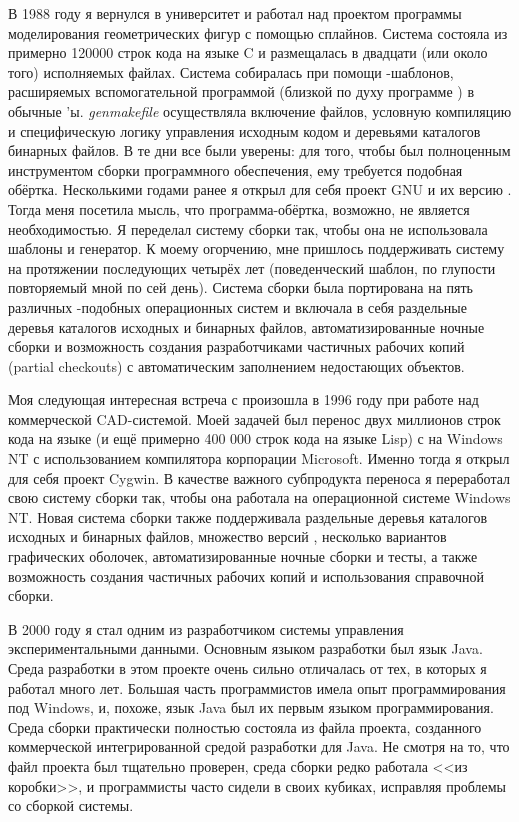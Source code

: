 В 1988 году я вернулся в университет и работал над проектом программы
моделирования геометрических фигур с помощью сплайнов. Система
состояла из примерно 120000 строк кода на языке C и размещалась в
двадцати (или около того) исполняемых файлах. Система собиралась при
помощи \Makefile{}-шаблонов, расширяемых вспомогательной программой
 (близкой по духу программе ) в
обычные \Makefile{}'ы. \textit{genmakefile} осуществляла включение
файлов, условную компиляцию и специфическую логику управления исходным
кодом и деревьями каталогов бинарных файлов. В те дни все были
уверены: для того, чтобы \GNUmake{} был полноценным инструментом
сборки программного обеспечения, ему требуется подобная обёртка.
Несколькими годами ранее я открыл для себя проект GNU и их версию
\GNUmake{}.  Тогда меня посетила мысль, что программа-обёртка,
возможно, не является необходимостью. Я переделал систему сборки так,
чтобы она не использовала шаблоны и генератор. К моему огорчению, мне
пришлось поддерживать систему на протяжении последующих четырёх лет
(поведенческий шаблон, по глупости повторяемый мной по сей день).
Система сборки была портирована на пять различных \UNIX{}-подобных
операционных систем и включала в себя раздельные деревья каталогов
исходных и бинарных файлов, автоматизированные ночные сборки и
возможность создания разработчиками частичных рабочих копий (partial
checkouts) с автоматическим заполнением недостающих объектов.

Моя следующая интересная встреча с \GNUmake{} произошла в 1996 году
при работе над коммерческой CAD\hyp{}системой. Моей задачей был
перенос двух миллионов строк кода на языке \Cplusplus{} (и ещё
примерно 400 000 строк кода на языке Lisp) с \UNIX{} на Windows NT с
использованием компилятора \Cplusplus{} корпорации Microsoft. Именно
тогда я открыл для себя проект Cygwin. В качестве важного субпродукта
переноса я переработал свою систему сборки так, чтобы она работала на
операционной системе Windows NT. Новая система сборки также
поддерживала раздельные деревья каталогов исходных и бинарных файлов,
множество версий \UNIX{}, несколько вариантов графических оболочек,
автоматизированные ночные сборки и тесты, а также возможность создания
частичных рабочих копий и использования справочной сборки.

В 2000 году я стал одним из разработчиком системы управления
экспериментальными данными.  Основным языком разработки был язык
Java. Среда разработки в этом проекте очень сильно отличалась от тех,
в которых я работал много лет. Большая часть программистов имела опыт
программирования под Windows, и, похоже, язык Java был их первым
языком программирования. Среда сборки практически полностью состояла
из файла проекта, созданного коммерческой интегрированной средой
разработки для Java.  Не смотря на то, что файл проекта был тщательно
проверен, среда сборки редко работала <<из коробки>>, и программисты
часто сидели в своих кубиках, исправляя проблемы со сборкой системы.

